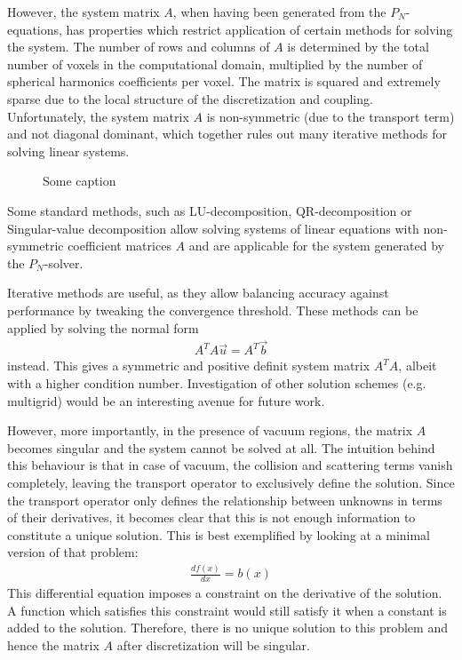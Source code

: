 However, the system matrix $A$, when having been generated from the $P_N$-equations, has properties which restrict application of certain methods for solving the system. The number of rows and columns of $A$ is determined by the total number of voxels in the computational domain, multiplied by the number of spherical harmonics coefficients per voxel. The matrix is squared and extremely sparse due to the local structure of the discretization and coupling. Unfortunately, the system matrix $A$ is non-symmetric (due to the transport term) and not diagonal dominant, which together rules out many iterative methods for solving linear systems.
\begin{figure}[h]
\centering
{}
\caption{Some caption}
\label{fig:pn_matrix_layout}
\end{figure}

Some standard methods, such as LU-decomposition, QR-decomposition or Singular-value decomposition allow solving systems of linear equations with non-symmetric coefficient matrices $A$ and are applicable for the system generated by the $P_N$-solver. 

Iterative methods are useful, as they allow balancing accuracy against performance by tweaking the convergence threshold. These methods can be applied by solving the normal form
\begin{align}
A^TA\vec{u} = A^T\vec{b}
\end{align}
instead. This gives a symmetric and positive definit system matrix $A^TA$, albeit with a higher condition number. Investigation of other solution schemes (e.g. multigrid) would be an interesting avenue for future work.

However, more importantly, in the presence of vacuum regions, the matrix $A$ becomes singular and the system cannot be solved at all. The intuition behind this behaviour is that in case of vacuum, the collision and scattering terms vanish completely, leaving the transport operator to exclusively define the solution. Since the transport operator only defines the relationship between unknowns in terms of their derivatives, it becomes clear that this is not enough information to constitute a unique solution. This is best exemplified by looking at a minimal version of that problem:
\begin{align*}
\frac{df\left(x\right)}{dx} = b\left(x\right)
\end{align*}
This differential equation imposes a constraint on the derivative of the solution. A function which satisfies this constraint would still satisfy it when a constant is added to the solution. Therefore, there is no unique solution to this problem and hence the matrix $A$ after discretization will be singular.

